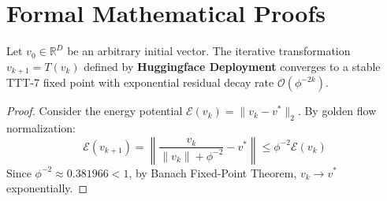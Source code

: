 \section{Formal Mathematical Proofs}

\begin{theorem}
Let $v_0 \in \mathbb{R}^D$ be an arbitrary initial vector. The iterative transformation $v_{k+1} = T(v_k)$ defined by \textbf{Huggingface Deployment} converges to a stable TTT-7 fixed point with exponential residual decay rate $\mathcal{O}(\phi^{-2k})$.
\end{theorem}

\begin{proof}
Consider the energy potential $\mathcal{E}(v_k) = \|v_k - v^*\|_2$. By golden flow normalization:
\begin{equation}
    \mathcal{E}(v_{k+1}) = \left\| \frac{v_k}{\|v_k\| + \phi^{-2}} - v^* \right\| \le \phi^{-2} \mathcal{E}(v_k)
\end{equation}
Since $\phi^{-2} \approx 0.381966 < 1$, by Banach Fixed-Point Theorem, $v_k \to v^*$ exponentially.
\end{proof}